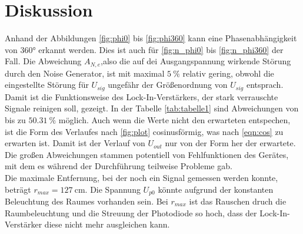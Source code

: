 \section{Diskussion}

Anhand der Abbildungen \ref{fig:phi0} bis \ref{fig:phi360} kann eine Phasenabhängigkeit von 360° erkannt werden.
Dies ist auch für \ref{fig:n_phi0} bis \ref{fig:n_phi360} der Fall.
Die Abweichung $A_{N,e}$,also die auf dei Ausgangspannung wirkende Störung durch den Noise Generator, ist mit maximal $\qty{5}{\percent}$ relativ gering, obwohl die eingestellte Störung für $U_{sig}$ ungefähr der Größenordnung von $U_{sig}$ entsprach.
Damit ist die Funktionsweise des Lock-In-Verstärkers, der stark verrauschte Signale reinigen soll, gezeigt. 
In der Tabelle \ref{tab:tabelle1} sind Abweichungen
von bis zu $\qty{50.31}{\percent}$ möglich.
Auch wenn die Werte nicht den erwarteten entspechen, ist die Form des Verlaufes nach \ref{fig:plot} cosinusförmig, was nach \ref{eqn:cos} zu erwarten ist.
Damit ist der Verlauf von $U_{out}$ nur von der Form her der erwartete.
Die großen Abweichungen stammen potentiell von Fehlfunktionen des Gerätes, mit dem es während der Durchführung teilweise Probleme gab.\\

\noindent 
Die maximale Entfernung, bei der noch ein Signal gemessen werden konnte, beträgt $r_{max}=\qty{127}{\centi\meter}$.
Die Spannung $U_{p0}$ könnte aufgrund der konstanten Beleuchtung des Raumes vorhanden sein.
Bei $r_{max}$ ist das Rauschen druch die Raumbeleuchtung und die Streuung der Photodiode so hoch, dass der Lock-In-Verstärker diese nicht mehr ausgleichen kann.

\label{sec:Diskussion}
